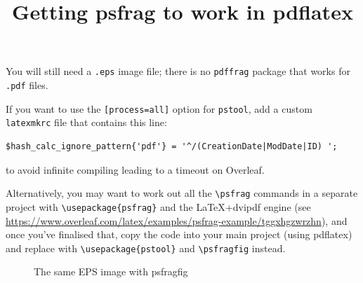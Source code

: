 \documentclass[12pt,a4paper]{article}
\title{Getting psfrag to work in pdflatex }
\begin{document}
You will still need a \texttt{.eps} image file; there is no \texttt{pdffrag} package that works for \texttt{.pdf} files. 

If you want to use the \texttt{[process=all]} option for \texttt{pstool}, add a custom \texttt{latexmkrc} file that contains this line:

\begin{verbatim}
$hash_calc_ignore_pattern{'pdf'} = '^/(CreationDate|ModDate|ID) ';
\end{verbatim}

to avoid infinite compiling leading to a timeout on Overleaf.

Alternatively, you may want to work out all the \verb|\psfrag| commands in a separate project with \verb|\usepackage{psfrag}| and the LaTeX+dvipdf engine (see \url{https://www.overleaf.com/latex/examples/psfrag-example/tggxhgzwrzhn}), and once you've finalised that, copy the code into your main project (using pdflatex) and replace with \verb|\usepackage{pstool}| and \verb|\psfragfig| instead.

\begin{figure}[h!]
\centering

\caption{The same EPS image with psfragfig}
\end{figure}
\end{document}
